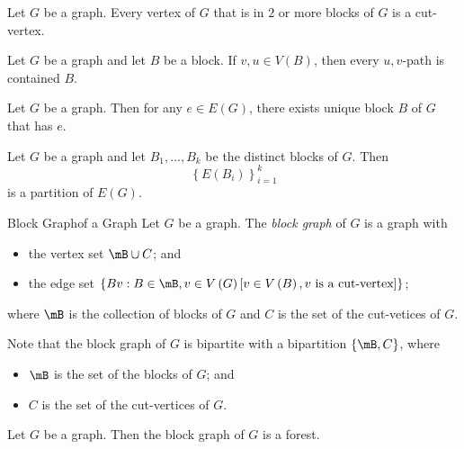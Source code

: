\documentclass[co342]{subfiles}
\begin{document}
    \clearpage
    \begin{prop}{}
        Let $G$ be a graph. Every vertex of $G$ that is in $2$ or more blocks of $G$ is a cut-vertex.
    \end{prop}

    \begin{prop}{}
        Let $G$ be a graph and let $B$ be a block. If $v,u\in V\left( B \right)$, then every $u,v$-path is contained $B$.
    \end{prop}

    \begin{prop}{}
        Let $G$ be a graph. Then for any $e\in E\left( G \right)$, there exists unique block $B$ of $G$ that has $e$.
    \end{prop}

    \begin{cor}{}
        Let $G$ be a graph and let $B_1,\ldots,B_k$ be the distinct blocks of $G$. Then
        \begin{equation*}
            \left\lbrace E\left( B_i \right) \right\rbrace^{k}_{i=1}
        \end{equation*}
        is a partition of $E\left( G \right)$.
    \end{cor}	

    \begin{definition}{Block Graph}{of a Graph}
        Let $G$ be a graph. The \emph{block graph} of $G$ is a graph with 
        \begin{itemize}
            \item the vertex set $\mB\cup C$; and
            \item the edge set $\left\lbrace Bv: B\in\mB, v\in V\left( G \right)\left[ v\in V\left( B \right), v\text{ is a cut-vertex} \right] \right\rbrace$;
        \end{itemize} 
        where $\mB$ is the collection of blocks of $G$ and $C$ is the set of the cut-vetices of $G$.
    \end{definition}
    
    \np Note that the block graph of $G$ is bipartite with a bipartition $\left\lbrace \mB,C \right\rbrace$, where
    \begin{itemize}
        \item $\mB$ is the set of the blocks of $G$; and
        \item $C$ is the set of the cut-vertices of $G$.
    \end{itemize} 

    \begin{prop}{}
        Let $G$ be a graph. Then the block graph of $G$ is a forest.
    \end{prop}
\end{document}
